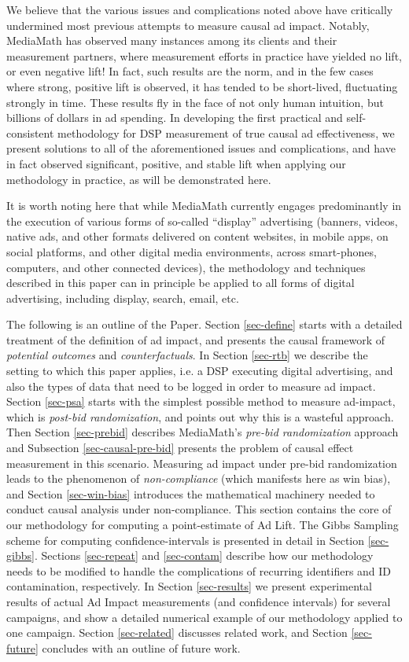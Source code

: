 \documentclass[11pt,a4paper]{article}
\theoremstyle{definition}
\theoremstyle{remark}
\theoremstyle{definition}
\theoremstyle{definition}
\theoremstyle{definition}
\theoremstyle{definition}
\theoremstyle{definition}
\theoremstyle{definition}
\begin{document}
We believe that the various issues and complications noted above have critically undermined most previous attempts to measure causal ad impact. Notably, MediaMath has observed many instances among its clients and their measurement partners, where measurement efforts in practice have yielded  no lift, or even negative lift! In fact, such results are the norm, and in the few cases where strong, positive lift is observed, it has tended to be short-lived, fluctuating strongly in time. These  results fly in the face of not only human intuition, but billions of dollars in ad spending. In developing the first practical and self-consistent methodology for DSP measurement of true causal ad effectiveness, we present solutions to all of the aforementioned issues and complications, and have in fact observed significant, positive, and stable lift when applying our methodology in practice, as will be demonstrated here.

It is worth noting here that while MediaMath currently engages predominantly in the execution of various forms of so-called “display” advertising (banners, videos, native ads, and other formats delivered on content websites, in mobile apps, on social platforms, and other digital media environments, across smart-phones, computers, and other connected devices), the methodology and techniques described in this paper can in principle be applied to all forms of digital advertising, including display, search, email, etc.

The following is an outline of the Paper. Section \ref{sec-define} starts with a detailed treatment of the definition of ad impact, and presents the causal framework of \textit{potential outcomes} and \textit{counterfactuals}. 
In Section \ref{sec-rtb} we describe the setting to which this paper applies, i.e. a DSP executing digital advertising, and also the types of data that need to be logged in order to measure ad impact.
Section \ref{sec-psa} starts with the simplest possible method to measure ad-impact, which is \textit{post-bid randomization}, and points out why this is a wasteful approach.
Then Section \ref{sec-prebid} describes MediaMath's  \textit{pre-bid randomization} approach and Subsection \ref{sec-causal-pre-bid} presents the problem of causal effect measurement in this scenario. Measuring ad impact under pre-bid randomization leads to the phenomenon of \textit{non-compliance} (which manifests here as win bias),
and Section \ref{sec-win-bias} introduces the mathematical machinery 
needed to conduct causal analysis under non-compliance. 
This section contains the core of our methodology for computing a point-estimate of Ad Lift. 
The Gibbs Sampling scheme for computing confidence-intervals is presented in detail in Section \ref{sec-gibbs}. 
Sections \ref{sec-repeat} and \ref{sec-contam} describe how our methodology needs to be modified to handle the complications of recurring identifiers and ID contamination, respectively. 
In Section \ref{sec-results} we present experimental results of actual Ad Impact measurements (and confidence intervals) for several campaigns, and show a detailed numerical example of our methodology applied to one campaign.
Section \ref{sec-related} discusses related work, and  
Section \ref{sec-future} concludes with an outline of future work.
\end{document}
